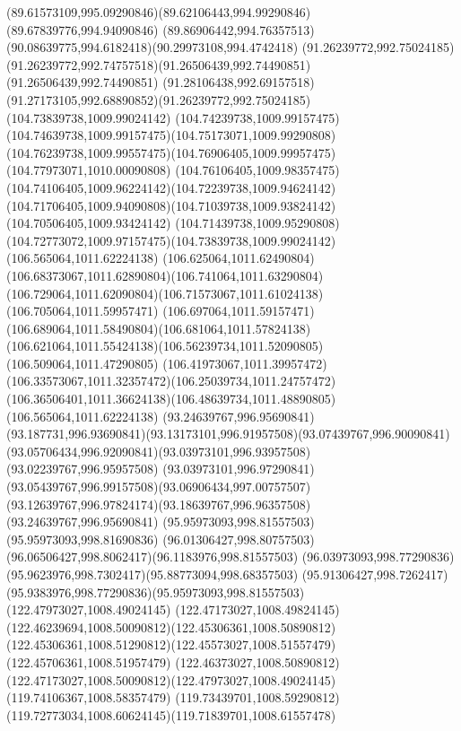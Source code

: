 {{\curveto(89.61573109,995.09290846)(89.62106443,994.99290846)(89.67839776,994.94090846)
\curveto(89.86906442,994.76357513)(90.08639775,994.6182418)(90.29973108,994.4742418)
\moveto(91.26239772,992.75024185)
\curveto(91.26239772,992.74757518)(91.26506439,992.74490851)(91.26506439,992.74490851)
\curveto(91.28106438,992.69157518)(91.27173105,992.68890852)(91.26239772,992.75024185)
\moveto(104.73839738,1009.99024142)
\curveto(104.74239738,1009.99157475)(104.74639738,1009.99157475)(104.75173071,1009.99290808)
\curveto(104.76239738,1009.99557475)(104.76906405,1009.99957475)(104.77973071,1010.00090808)
\curveto(104.76106405,1009.98357475)(104.74106405,1009.96224142)(104.72239738,1009.94624142)
\curveto(104.71706405,1009.94090808)(104.71039738,1009.93824142)(104.70506405,1009.93424142)
\curveto(104.71439738,1009.95290808)(104.72773072,1009.97157475)(104.73839738,1009.99024142)
\moveto(106.565064,1011.62224138)
\curveto(106.625064,1011.62490804)(106.68373067,1011.62890804)(106.741064,1011.63290804)
\curveto(106.729064,1011.62090804)(106.71573067,1011.61024138)(106.705064,1011.59957471)
\curveto(106.697064,1011.59157471)(106.689064,1011.58490804)(106.681064,1011.57824138)
\curveto(106.621064,1011.55424138)(106.56239734,1011.52090805)(106.509064,1011.47290805)
\curveto(106.41973067,1011.39957472)(106.33573067,1011.32357472)(106.25039734,1011.24757472)
\curveto(106.36506401,1011.36624138)(106.48639734,1011.48890805)(106.565064,1011.62224138)
\moveto(93.24639767,996.95690841)
\curveto(93.187731,996.93690841)(93.13173101,996.91957508)(93.07439767,996.90090841)
\curveto(93.05706434,996.92090841)(93.03973101,996.93957508)(93.02239767,996.95957508)
\curveto(93.03973101,996.97290841)(93.05439767,996.99157508)(93.06906434,997.00757507)
\curveto(93.12639767,996.97824174)(93.18639767,996.96357508)(93.24639767,996.95690841)
\moveto(95.95973093,998.81557503)
\lineto(95.95973093,998.81690836)
\curveto(96.01306427,998.80757503)(96.06506427,998.8062417)(96.1183976,998.81557503)
\curveto(96.03973093,998.77290836)(95.9623976,998.7302417)(95.88773094,998.68357503)
\curveto(95.91306427,998.7262417)(95.9383976,998.77290836)(95.95973093,998.81557503)
\moveto(122.47973027,1008.49024145)
\curveto(122.47173027,1008.49824145)(122.46239694,1008.50090812)(122.45306361,1008.50890812)
\curveto(122.45306361,1008.51290812)(122.45573027,1008.51557479)(122.45706361,1008.51957479)
\curveto(122.46373027,1008.50890812)(122.47173027,1008.50090812)(122.47973027,1008.49024145)
\moveto(119.74106367,1008.58357479)
\curveto(119.73439701,1008.59290812)(119.72773034,1008.60624145)(119.71839701,1008.61557478)
}}
